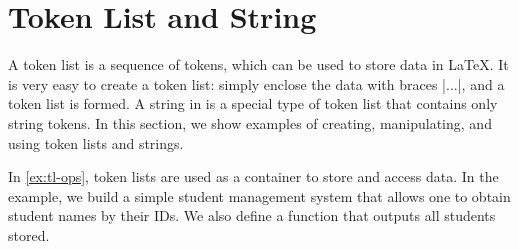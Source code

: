 \section{Token List and String}

A token list is a sequence of tokens, which can be used to store data in \LaTeX{}.
It is very easy to create a token list: simply enclose the data with braces \inlpl|{...}|, and a token list is formed.
A string in \LTT{} is a special type of token list that contains only string tokens.
In this section, we show examples of creating, manipulating, and using token lists and strings.

In \cref{ex:tl-ops}, token lists are used as a container to store and access data.
In the example, we build a simple student management system that allows one to obtain student names by their IDs.
We also define a function that outputs all students stored.
